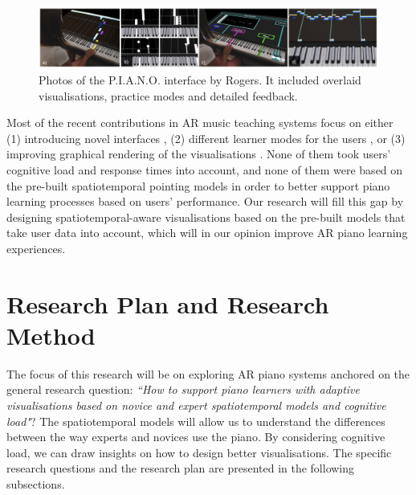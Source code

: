 \documentclass[manuscript,screen]{acmart}
\begin{document}
\begin{itemize}
\end{itemize}

\begin{figure}[h]
\centering
 \includegraphics[width=12cm]{figures/pianoUBC.png}
    \caption{Photos of the P.I.A.N.O. interface by Rogers. It included overlaid visualisations, practice modes and detailed feedback. 
    }\label{fig:ubicomp}
\end{figure}

Most of the recent contributions in AR music teaching systems focus on either (1) introducing novel interfaces \cite{barakonyi2005augmented, huang2011piano}, (2) different learner modes for the users \cite{weing2013piano, rogers2014piano}, or (3) improving graphical rendering of the visualisations \cite{chow2013music, zheng2013general}. None of them took users' cognitive load and response times into account, and none of them were based on the pre-built spatiotemporal pointing models in order to better support piano learning processes based on users' performance. Our research will fill this gap by designing spatiotemporal-aware visualisations based on the pre-built models that take user data into account, which will in our opinion improve AR piano learning experiences.\\

\section{Research Plan and Research Method}
\label{sec:plan}

The focus of this research will be on exploring AR piano systems anchored on the general research question: \textit{``How to support piano learners with adaptive visualisations based on novice and expert spatiotemporal models and cognitive load"}? The spatiotemporal models will allow us to understand the differences between the way experts and novices use the piano. By considering cognitive load, we can draw insights on how to design better visualisations. The specific research questions and the research plan are presented in the following subsections. 
\end{document}
